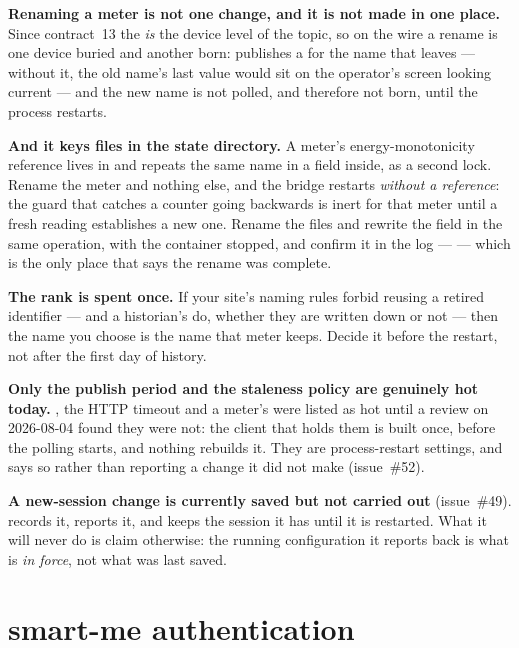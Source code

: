 \begin{warning}
\textbf{Renaming a meter is not one change, and it is not made in one place.} Since contract~13
the  \emph{is} the device level of the topic, so on the wire a rename is one
device buried and another born: \prog{} publishes a  for the name that leaves ---
without it, the old name's last value would sit on the operator's screen looking current --- and
the new name is not polled, and therefore not born, until the process restarts.

\textbf{And it keys files in the state directory.} A meter's energy-monotonicity reference lives in
 and repeats the same name in a  field inside,
as a second lock. Rename the meter and nothing else, and the bridge restarts \emph{without a
reference}: the guard that catches a counter going backwards is inert for that meter until a fresh
reading establishes a new one. Rename the files and rewrite the field in the same operation, with
the container stopped, and confirm it in the log ---  --- which is the only place that says the rename was complete.

\textbf{The rank is spent once.} If your site's naming rules forbid reusing a retired identifier
--- and a historian's do, whether they are written down or not --- then the name you choose is the
name that meter keeps. Decide it before the restart, not after the first day of history.
\end{warning}

\begin{warning}
\textbf{Only the publish period and the staleness policy are genuinely hot today.}
, the HTTP timeout and a meter's  were listed as hot until a
review on 2026-08-04 found they were not: the client that holds them is built once, before the
polling starts, and nothing rebuilds it. They are process-restart settings, and \prog says so
rather than reporting a change it did not make (issue~\#52).

\textbf{A new-session change is currently saved but not carried out} (issue~\#49). \prog
records it, reports it, and keeps the session it has until it is restarted. What it will
never do is claim otherwise: the running configuration it reports back is what is
\emph{in force}, not what was last saved.
\end{warning}

\section{smart-me authentication}
\label{sec:smartme-auth}

